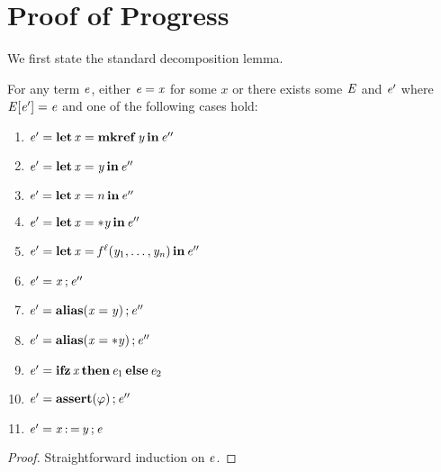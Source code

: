 \section{Proof of Progress}
\label{sec:progress-proof}

We first state the standard decomposition lemma.
\begin{lemma}[Decomposition]
  \label{lem:decomposition}
  For any term $\mathit{e}$, either $\mathit{e}  =  \mathit{x}$ for some $\mathit{x}$ or there exists some $\mathit{E}$ and $\mathit{e'}$ where $\mathit{E}  [  \mathit{e'}  ]  =  \mathit{e}$ and one of the following
  cases hold:
  \begin{enumerate}
  \item $\mathit{e'}  =   \operatorname{\mathbf{let}}  \mathit{x}  =   \operatorname{\mathbf{mkref}}  \mathit{y}   \operatorname{\mathbf{in}}  \mathit{e''} $
  \item $\mathit{e'}  =   \operatorname{\mathbf{let}}  \mathit{x}  =  \mathit{y}  \operatorname{\mathbf{in}}  \mathit{e''} $
  \item $\mathit{e'}  =   \operatorname{\mathbf{let}}  \mathit{x}  =  n  \operatorname{\mathbf{in}}  \mathit{e''} $
  \item $\mathit{e'}  =   \operatorname{\mathbf{let}}  \mathit{x}  =   *  \mathit{y}   \operatorname{\mathbf{in}}  \mathit{e''} $
  \item $\mathit{e'}  =   \operatorname{\mathbf{let}}  \mathit{x}  =   \mathit{f} ^ \ell (  \mathit{y_{{\mathrm{1}}}} ,\ldots, \mathit{y_{\mathit{n}}}  )   \operatorname{\mathbf{in}}  \mathit{e''} $
  \item $ \mathit{e'}  =  \mathit{x}  \operatorname{;}  \mathit{e''} $
  \item $\mathit{e'}  =   \mathbf{alias}( \mathit{x}  =  \mathit{y} ) \operatorname{;}  \mathit{e''} $
  \item $\mathit{e'}  =   \mathbf{alias}( \mathit{x}  = *  \mathit{y} ) \operatorname{;}  \mathit{e''} $
  \item $\mathit{e'}  =   \operatorname{\mathbf{ifz}}  \mathit{x}  \operatorname{\mathbf{then}}  \mathit{e_{{\mathrm{1}}}}  \operatorname{\mathbf{else}}  \mathit{e_{{\mathrm{2}}}} $
  \item $\mathit{e'}  =   \mathbf{assert}( \varphi ) \operatorname{;}  \mathit{e''} $
  \item $\mathit{e'}  =   \mathit{x}  \operatorname{:=}  \mathit{y}  \operatorname{;}  \mathit{e} $
  \end{enumerate}
\end{lemma}
\begin{proof}
  Straightforward induction on $\mathit{e}$.
\end{proof}

